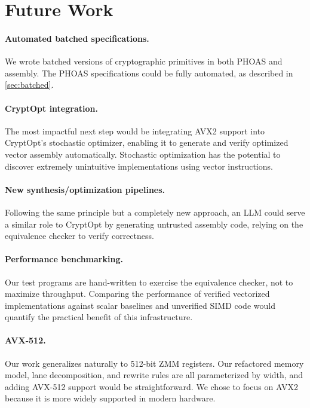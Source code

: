 \section{Future Work}

\paragraph{Automated batched specifications.}
We wrote batched versions of cryptographic primitives in both PHOAS and assembly. 
The PHOAS specifications could be fully automated, as described in \autoref{sec:batched}.

\paragraph{CryptOpt integration.}
The most impactful next step would be integrating AVX2 support into CryptOpt's stochastic optimizer, enabling it to generate and verify optimized vector assembly automatically.
Stochastic optimization has the potential to discover extremely unintuitive implementations using vector instructions.

\paragraph{New synthesis/optimization pipelines.}
Following the same principle but a completely new approach, an LLM could serve a similar role to CryptOpt by generating untrusted assembly code, relying on the equivalence checker to verify correctness. 

\paragraph{Performance benchmarking.}
Our test programs are hand-written to exercise the equivalence checker, not to maximize throughput.
Comparing the performance of verified vectorized implementations against scalar baselines and unverified SIMD code would quantify the practical benefit of this infrastructure.

\paragraph{AVX-512.}
Our work generalizes naturally to 512-bit ZMM registers. Our refactored memory model, lane decomposition, and rewrite rules are all parameterized by width, and adding AVX-512 support would be straightforward. We chose to focus on AVX2 because it is more widely supported in modern hardware.
